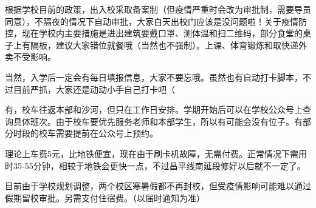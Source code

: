 
根据学校目前的政策，出入校采取备案制（但疫情严重时会改为审批制，需要导员同意），不隔夜的情况下自动审批，大家白天出校门应该是没问题啦！关于疫情防控，现在学校内主要措施是进出建筑要戴口罩、测体温和扫二维码，部分食堂的桌子上有隔板，建议大家错位就餐哦（当然也不强制）。上课、体育锻炼和取快递外卖不受影响。

当然，入学后一定会有每日填报信息，大家不要忘哦。虽然也有自动打卡脚本，不过目前严抓，大家还是动动小手自己打卡吧（


有，校车往返本部和沙河，但只在工作日安排。学期开始后可以在学校公众号上查询具体班次。由于校车要优先服务老师和本部学生，所以有可能会没有位子。有部分时段的校车需要提前在公众号上预约。

理论上车费5元，比地铁便宜，现在由于刷卡机故障，无需付费。正常情况下需用时35-55分钟，相较于地铁会更快一点，不过昌平线南延段修好以后就不一定了。


目前由于学校规划调整，两个校区寒暑假都不再封校，但受疫情影响可能难以通过假期留校审批。另需支付住宿费。（以届时通知为准）
